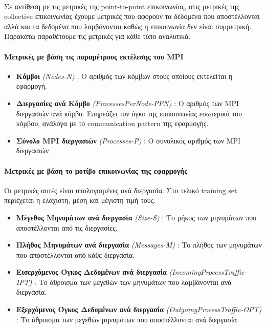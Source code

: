 \paragraph{}
Σε αντίθεση με τις μετρικές της point-to-point επικοινωνίας, στις μετρικές της collective επικοινωνίας έχουμε μετρικές που αφορούν τα δεδομένα που αποστέλλονται αλλά και τα δεδομένα που λαμβάνονται καθώς η επικοινωνία δεν είναι συμμετρική. Παρακάτω παραθέτουμε τις μετρικές για κάθε τύπο αναλυτικά. 
\paragraph{Μετρικές με βάση τις παραμέτρους εκτέλεσης του MPI}
\begin{itemize}
\item \textbf{Κόμβοι} \textit{(Νodes-N)} : Ο αριθμός των κόμβων στους οποίους εκτελείται η εφαρμογή. 
\item \textbf{Διεργασίες ανά Κόμβο} \textit{(ProcessesPerNode-PPN)} : Ο αριθμός των MPI διεργασιών ανά κόμβο. Επηρεάζει τον όγκο της επικοινωνίας εσωτερικά του κόμβου, ανάλογα με το communication pattern της εφαρμογής.
\item \textbf{Σύνολο MPI διεργασιών} \textit{(Processes-P)} : Ο συνολικός αριθμός των MPI διεργασιών.
\end{itemize}

\paragraph{Μετρικές με βάση το μοτίβο επικοινωνίας της εφαρμογής\\} 
Οι μετρικές αυτές είναι υπολογισμένες ανά διεργασία. Στο τελικό training set περιέχεται η ελάχιστη, μέση και μέγιστη τιμή τους. 
\begin{itemize}
\item \textbf{Μέγεθος Μηνυμάτων ανά διεργασία} \textit{(Size-S)} :  Το μήκος των μηνυμάτων που αποστέλλονται από τις διεργασίες.
\item \textbf{Πλήθος Μηνυμάτων ανά διεργασία} \textit{(Messages-M)} : Το πλήθος των μηνυμάτων που αποστέλλονται από κάθε διεργασία.
\item \textbf{Εισερχόμενος Όγκος Δεδομένων ανά διεργασία} \textit{ (IncomingProcess\-Traffic-IPT) } : Το άθροισμα των μεγεθών των  μηνυμάτων που λαμβάνονται ανά διεργασία. 
\item \textbf{Εξερχόμενος Όγκος Δεδομένων ανά διεργασία} \textit{ (OutgoingProcess\-Traffic-ΟPT) } : Το άθροισμα των μεγεθών μηνυμάτων που αποστέλλονται ανά διεργασία.
\end{itemize}

